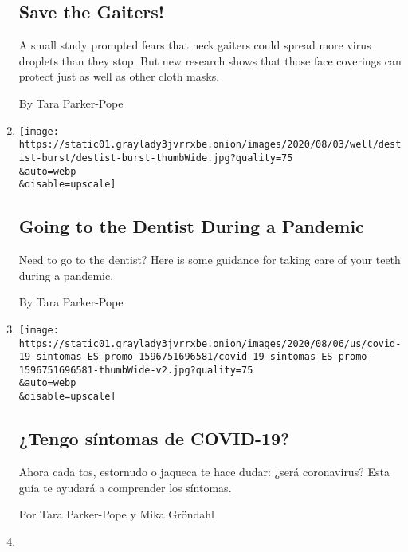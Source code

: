 \begin{enumerate}
  \hypertarget{save-the-gaiters}{%
  \subsection{Save the Gaiters!}\label{save-the-gaiters}}

  A small study prompted fears that neck gaiters could spread more virus
  droplets than they stop. But new research shows that those face
  coverings can protect just as well as other cloth masks.

  By Tara Parker-Pope
\item
  \href{/interactive/2020/08/10/well/going-to-the-dentist-during-covid-pandemic.html}{}

  \texttt{[image: https://static01.graylady3jvrrxbe.onion/images/2020/08/03/well/destist-burst/destist-burst-thumbWide.jpg?quality=75\\\&auto=webp\\\&disable=upscale]}

  \hypertarget{going-to-the-dentist-during-a-pandemic}{%
  \subsection{Going to the Dentist During a
  Pandemic}\label{going-to-the-dentist-during-a-pandemic}}

  Need to go to the dentist? Here is some guidance for taking care of
  your teeth during a pandemic.

  By Tara Parker-Pope
\item
  \href{/es/interactive/2020/08/06/espanol/ciencia-y-tecnologia/tengo-covid-19-sintomas.html}{}

  \texttt{[image: https://static01.graylady3jvrrxbe.onion/images/2020/08/06/us/covid-19-sintomas-ES-promo-1596751696581/covid-19-sintomas-ES-promo-1596751696581-thumbWide-v2.jpg?quality=75\\\&auto=webp\\\&disable=upscale]}

  \hypertarget{tengo-suxedntomas-de-covid-19}{%
  \subsection{¿Tengo síntomas de
  COVID-19?}\label{tengo-suxedntomas-de-covid-19}}

  Ahora cada tos, estornudo o jaqueca te hace dudar: ¿será coronavirus?
  Esta guía te ayudará a comprender los síntomas.

  Por Tara Parker-Pope y Mika Gröndahl
\item
  \href{/es/interactive/2020/08/06/espanol/ciencia-y-tecnologia/tengo-covid-19-sintomas.html}{}


\end{enumerate}
